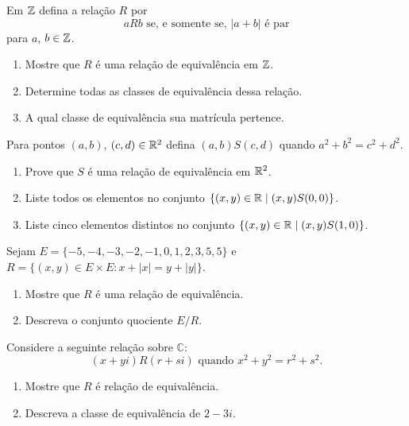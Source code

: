\documentclass[12pt]{exam}
\begin{document}
    \questao{} Em $\mathbb{Z}$ defina a relação $R$ por
    \[
        a R b \mbox{ se, e somente se, } |a + b| \mbox{ é par}
    \]
    para $a$, $b \in \mathbb{Z}$.
    \begin{enumerate}[label={\alph*})]
        \item Mostre que $R$ é uma relação de equivalência em $\mathbb{Z}$.

        \item Determine todas as classes de equivalência dessa relação.

        \item A qual classe de equivalência sua matrícula pertence.
    \end{enumerate}

    \vspace{.3cm}

    \questao{} Para pontos $(a, b)$, $(c, d) \in \mathbb{R}^2$ defina $(a, b) S (c, d)$ quando $a^2 + b^2 = c^2 + d^2$.
    \begin{enumerate}[label={\alph*})]
      \item Prove que $S$ é uma relação de equivalência em $\mathbb{R}^2$.

      \item Liste todos os elementos no conjunto $\{(x, y) \in \mathbb{R} \mid (x, y) S (0, 0)\}$.

      \item Liste cinco elementos distintos no conjunto $\{(x, y) \in \mathbb{R} \mid (x, y) S (1, 0)\}$.
    \end{enumerate}

    \vspace{.3cm}

    \questao{} Sejam $E = \{-5, -4, -3, -2, -1, 0, 1, 2, 3, 5, 5\}$ e $R = \{(x, y) \in E \times E : x + |x| = y + |y|\}$.
    \begin{enumerate}[label={\alph*})]
        \item Mostre que $R$ é uma relação de equivalência.

        \item Descreva o conjunto quociente $E/R$.
    \end{enumerate}
    \vspace{.3cm}

    \vspace{.3cm}

    \questao{} Considere a seguinte relação sobre $\mathbb{C}$:
    \[
        (x+yi) R (r+si) \mbox{ quando } x^2+y^2=r^2+s^2.
    \]
    \begin{enumerate}[label={\alph*})]
        \item Mostre que $R$ é relação de equivalência.

        \item Descreva a classe de equivalência de $2 - 3i$.
    \end{enumerate}
\end{document}
